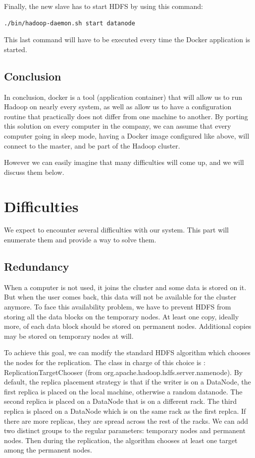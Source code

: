 \documentclass[11pt]{report} %
\begin{document}
Finally, the new slave has to start HDFS by using this command:
\begin{lstlisting}[language=bash]
./bin/hadoop-daemon.sh start datanode
\end{lstlisting}
This last command will have to be executed every time the Docker application is started.

\section{Conclusion}
In conclusion, docker is a tool (application container) that will allow us to run Hadoop on nearly every system, as well as allow us to have a configuration routine that practically does not differ from one machine to another. By porting this solution on every computer in the company, we can assume that every computer going in sleep mode, having a Docker image configured like above, will connect to the master, and be part of the Hadoop cluster.

However we can easily imagine that many difficulties will come up, and we will discuss them below.

\chapter{Difficulties}

We expect to encounter several difficulties with our system. This part will enumerate them and provide a way to solve them.

\section{Redundancy}
When a computer is not used, it joins the cluster and some data is stored on it. But when the user comes back, this data will not be available for the cluster anymore. To face this availability problem, we have to prevent HDFS from storing all the data blocks on the temporary nodes. At least one copy, ideally more, of each data block should be stored on permanent nodes. Additional copies may be stored on temporary nodes at will.

To achieve this goal, we can modify the standard HDFS algorithm which chooses the nodes for the replication. The class in charge of this choice is : ReplicationTargetChooser (from org.apache.hadoop.hdfs.server.namenode). By default, the replica placement strategy is that if the writer is on a DataNode, the first replica is placed on the local machine, otherwise a random datanode. The second replica is placed on a DataNode that is on a different rack. The third replica is placed on a DataNode which is on the same rack as the first replca. If there are more replicas, they are spread across the rest of the racks.
We can add two distinct groups to the regular parameters: temporary nodes and permanent nodes. Then during the replication, the algorithm chooses at least one target among the permanent nodes.
\end{document}
